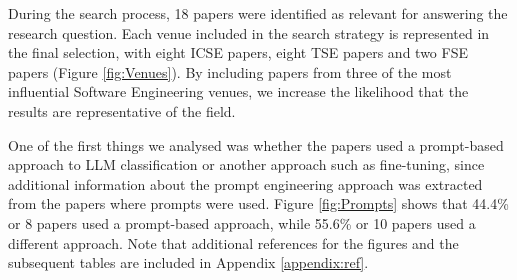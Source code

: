 \documentclass[a4paper]{article}
\begin{document}
During the search process, 18 papers were identified as relevant for answering the research question. Each venue included in the search strategy is represented in the final selection, with eight ICSE papers, eight TSE papers and two FSE papers (Figure \ref{fig:Venues}). By including papers from three of the most influential Software Engineering venues, we increase the likelihood that the results are representative of the field. 
	
One of the first things we analysed was whether the papers used a prompt-based approach to LLM classification or another approach such as fine-tuning, since additional information about the prompt engineering approach was extracted from the papers where prompts were used. Figure \ref{fig:Prompts} shows that 44.4\% or 8 papers used a prompt-based approach, while 55.6\% or 10 papers used a different approach. Note that additional references for the figures and the subsequent tables are included in Appendix \ref{appendix:ref}.
\end{document}
